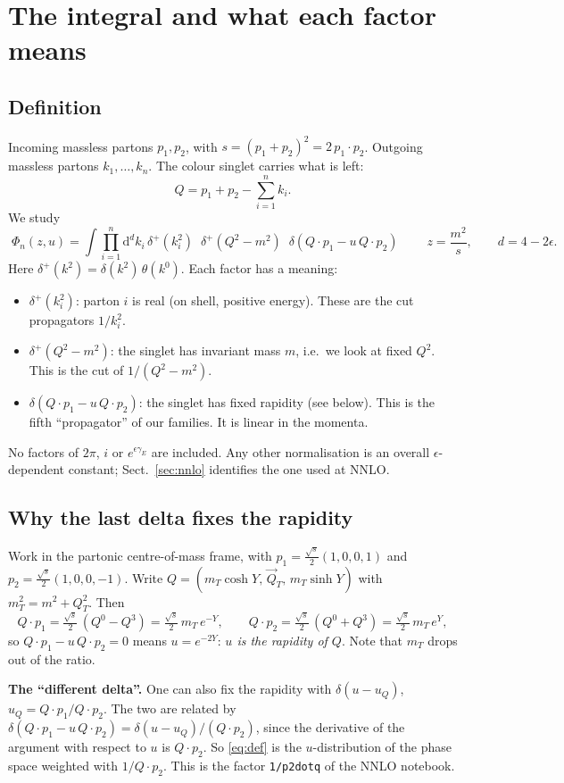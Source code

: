 \documentclass[11pt,a4paper]{article}
\newcommand{\ep}{\epsilon}
\newcommand{\dd}{\mathrm{d}}
\newcommand{\note}[1]{\par\smallskip\noindent\colorbox{gray!12}{\parbox{\dimexpr\linewidth-2\fboxsep}{\small #1}}\par\smallskip}
\begin{document}
\section{The integral and what each factor means}
\label{sec:def}
\subsection{Definition}
Incoming massless partons $p_1,p_2$, with $s=(p_1+p_2)^2=2\,p_1\!\cdot p_2$. Outgoing massless partons
$k_1,\dots,k_n$. The colour singlet carries what is left:
\[ Q=p_1+p_2-\sum_{i=1}^n k_i . \]
We study
\begin{equation}
  \boxed{\;\Phi_n(z,u)=\int\prod_{i=1}^n \dd^dk_i\,\delta^+(k_i^2)\;\;\delta^+(Q^2-m^2)\;\;
  \delta(Q\cdot p_1-u\,Q\cdot p_2)\;}
  \qquad z=\frac{m^2}{s},\qquad d=4-2\ep .
  \label{eq:def}
\end{equation}
Here $\delta^+(k^2)=\delta(k^2)\,\theta(k^0)$. Each factor has a meaning:
\begin{itemize}
\item $\delta^+(k_i^2)$: parton $i$ is real (on shell, positive energy). These are the cut propagators $1/k_i^2$.
\item $\delta^+(Q^2-m^2)$: the singlet has invariant mass $m$, i.e.\ we look at fixed $Q^2$. This is the cut of
  $1/(Q^2-m^2)$.
\item $\delta(Q\cdot p_1-u\,Q\cdot p_2)$: the singlet has fixed rapidity (see below). This is the fifth
  ``propagator'' of our families. It is linear in the momenta.
\end{itemize}
No factors of $2\pi$, $i$ or $e^{\ep\gamma_E}$ are included. Any other normalisation is an overall $\ep$-dependent
constant; Sect.~\ref{sec:nnlo} identifies the one used at NNLO.

\subsection{Why the last delta fixes the rapidity}
Work in the partonic centre-of-mass frame, with $p_1=\frac{\sqrt s}2(1,0,0,1)$ and
$p_2=\frac{\sqrt s}2(1,0,0,-1)$. Write $Q=(m_T\cosh Y,\,\vec Q_T,\,m_T\sinh Y)$ with $m_T^2=m^2+Q_T^2$. Then
\[
  Q\cdot p_1=\tfrac{\sqrt s}{2}\,(Q^0-Q^3)=\tfrac{\sqrt s}{2}\,m_T\,e^{-Y},\qquad
  Q\cdot p_2=\tfrac{\sqrt s}{2}\,(Q^0+Q^3)=\tfrac{\sqrt s}{2}\,m_T\,e^{Y},
\]
so $Q\cdot p_1-u\,Q\cdot p_2=0$ means $u=e^{-2Y}$: \emph{$u$ is the rapidity of $Q$}. Note that
$m_T$ drops out of the ratio.

\note{\textbf{The ``different delta''.} One can also fix the rapidity with $\delta(u-u_Q)$,
$u_Q=Q\cdot p_1/Q\cdot p_2$. The two are related by
$\delta(Q\cdot p_1-u\,Q\cdot p_2)=\delta(u-u_Q)/(Q\cdot p_2)$, since the derivative of the argument with
respect to $u$ is $Q\cdot p_2$. So \eqref{eq:def} is the $u$-distribution of the phase space weighted with
$1/Q\cdot p_2$. This is the factor \texttt{1/p2dotq} of the NNLO notebook.}
\end{document}

